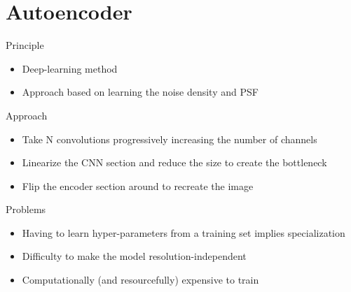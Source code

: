 \section{Autoencoder}
\frame{\sectionpage}

\begin{frame}{Principle}

\begin{itemize}
\item Deep-learning method
\item Approach based on learning the noise density and PSF
\end{itemize}

\end{frame}

\begin{frame}{Approach}
\begin{itemize}
    \item Take N convolutions progressively increasing the number of channels
    \item Linearize the CNN section and reduce the size to create the bottleneck
    \item Flip the encoder section around to recreate the image
\end{itemize}
\end{frame}

\begin{frame}{Problems}
\begin{itemize}
    \item Having to learn hyper-parameters from a training set implies specialization
    \item Difficulty to make the model resolution-independent
    \item Computationally (and resourcefully) expensive to train
\end{itemize}
\end{frame}